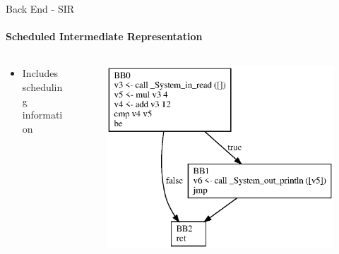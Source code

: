 \documentclass[en,16:9]{sdqbeamer}
\begin{document}
\begin{frame}{Back End - SIR}
	\framesubtitle{Scheduled Intermediate Representation}
	
	\begin{columns}
		\begin{column}{0.5\textwidth}
			\begin{itemize}
				\item Includes scheduling information
			\end{itemize}
		\end{column}
	
		\begin{column}{0.5\textwidth}
			\begin{figure}
				\centering
				\includegraphics[scale=0.6]{images/sir-before-reg-alloc}
			\end{figure}
		\end{column}
	\end{columns}
	
\end{frame}
\end{document}
